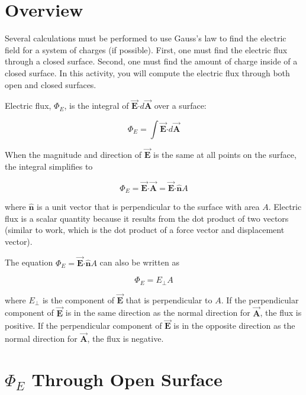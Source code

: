 \documentclass{article}
\newcommand{\bfvec}[1]{\vec{\mathbf{#1}}}
\newcommand{\bfcdot}[0]{\boldsymbol{\cdot}}
\begin{document}
\section{Overview}

Several calculations must be performed to use Gauss's law to find the electric field for a system of charges (if possible). First, one must find the electric flux through a closed surface. Second, one must find the amount of charge inside of a closed surface. In this activity, you will compute the electric flux through both open and closed surfaces.

Electric flux, $\Phi_E$, is the integral of $\bfvec{E}\bfcdot d\bfvec{A}$ over a surface: 

\begin{equation}
\Phi_E=\int\bfvec{E}\bfcdot d\bfvec{A}
\end{equation}

When the magnitude and direction of $\bfvec{E}$ is the same at all points on the surface, the integral simplifies to 

\begin{equation}
\Phi_E = \bfvec{E}\bfcdot \bfvec{A} = \bfvec{E}\bfcdot \hat{\mathbf{n}}A
\end{equation}

where $\hat{\mathbf{n}}$ is a unit vector that is perpendicular to the surface with area $A$. Electric flux is a scalar quantity because it results from the dot product of two vectors (similar to work, which is the dot product of a force vector and displacement vector).

The equation $\Phi_E = \bfvec{E}\bfcdot \hat{\mathbf{n}}A$ can also be written as

\begin{equation}
\Phi_E = E_{\perp}A
\end{equation}

where $E_{\perp}$ is the component of $\bfvec{E}$ that is perpendicular to $A$. If the perpendicular component of $\bfvec{E}$ is in the same direction as the normal direction for $\bfvec{A}$, the flux is positive. If the perpendicular component of $\bfvec{E}$ is in the opposite direction as the normal direction for $\bfvec{A}$, the flux is negative.

\newpage

\section{$\Phi_E$ Through Open Surface}
\end{document}
